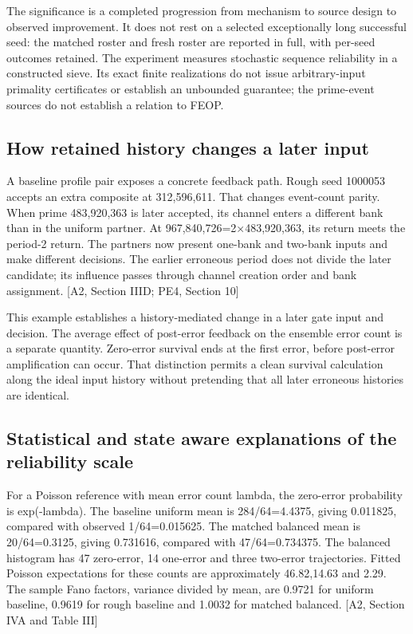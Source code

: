 The significance is a completed progression from mechanism to source design to observed improvement. It does not rest on a selected exceptionally long successful seed: the matched roster and fresh roster are reported in full, with per-seed outcomes retained. The experiment measures stochastic sequence reliability in a constructed sieve. Its exact finite realizations do not issue arbitrary-input primality certificates or establish an unbounded guarantee; the prime-event sources do not establish a relation to FEOP.

\subsection{How retained history changes a later input}\label{how-retained-history-changes-a-later-input}

A baseline profile pair exposes a concrete feedback path. Rough seed 1000053 accepts an extra composite at 312,596,611. That changes event-count parity. When prime 483,920,363 is later accepted, its channel enters a different bank than in the uniform partner. At 967,840,726=2×483,920,363, its return meets the period-2 return. The partners now present one-bank and two-bank inputs and make different decisions. The earlier erroneous period does not divide the later candidate; its influence passes through channel creation order and bank assignment. {[}A2, Section IIID; PE4, Section 10{]}

This example establishes a history-mediated change in a later gate input and decision. The average effect of post-error feedback on the ensemble error count is a separate quantity. Zero-error survival ends at the first error, before post-error amplification can occur. That distinction permits a clean survival calculation along the ideal input history without pretending that all later erroneous histories are identical.

\subsection{Statistical and state aware explanations of the reliability scale}\label{statistical-and-state-aware-explanations-of-the-reliability-scale}

For a Poisson reference with mean error count lambda, the zero-error probability is exp(-lambda). The baseline uniform mean is 284/64=4.4375, giving 0.011825, compared with observed 1/64=0.015625. The matched balanced mean is 20/64=0.3125, giving 0.731616, compared with 47/64=0.734375. The balanced histogram has 47 zero-error, 14 one-error and three two-error trajectories. Fitted Poisson expectations for these counts are approximately 46.82,14.63 and 2.29. The sample Fano factors, variance divided by mean, are 0.9721 for uniform baseline, 0.9619 for rough baseline and 1.0032 for matched balanced. {[}A2, Section IVA and Table III{]}

